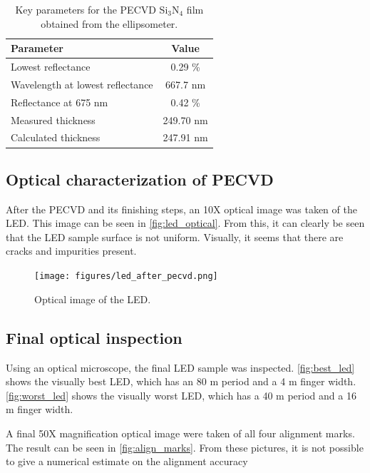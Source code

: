 \begin{table}
    \centering
    \caption{Key parameters for the PECVD Si$_3$N$_4$ film obtained from the ellipsometer.}
    \label{tab:pecvd_ellipsometer}
    \begin{tabular}{lc}
    \hline
    \textbf{Parameter}               & \textbf{Value} \\ \hline
    Lowest reflectance               & 0.29 \%        \\
    Wavelength at lowest reflectance & 667.7 nm       \\
    Reflectance at 675 nm            &  0.42 \%       \\
    Measured thickness               & 249.70 nm      \\
    Calculated thickness             & 247.91 nm      \\ \hline
    \end{tabular}
\end{table}


\subsection{Optical characterization of PECVD}

After the PECVD and its finishing steps, an 10X optical image was taken of the LED.
This image can be seen in \autoref{fig:led_optical}.
From this, it can clearly be seen that the LED sample surface is not uniform.
Visually, it seems that there are cracks and impurities present.

\begin{figure}
    \centering
    \texttt{[image: figures/led\_after\_pecvd.png]}
    \caption{Optical image of the LED.}
    \label{fig:led_optical}
\end{figure}


\subsection{Final optical inspection}

Using an optical microscope, the final LED sample was inspected.
\autoref{fig:best_led} shows the visually best LED, which has an 80 \textmu m period and a 4 \textmu m finger width.
\autoref{fig:worst_led} shows the visually worst LED, which has a 40 \textmu m period and a 16 \textmu m finger width.

A final 50X magnification optical image were taken of all four alignment marks.
The result can be seen in \autoref{fig:align_marks}.
From these pictures, it is not possible to give a numerical estimate on the alignment accuracy

